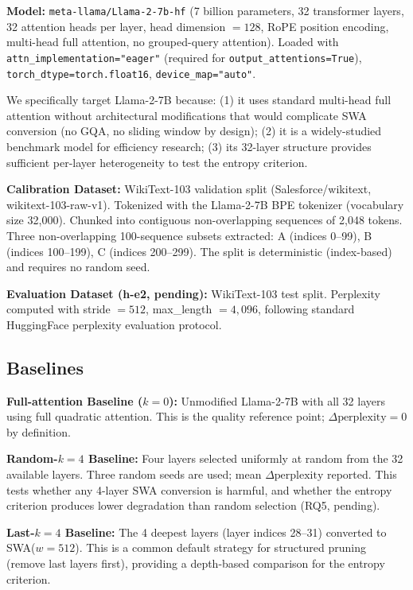 \textbf{Model:} \texttt{meta-llama/Llama-2-7b-hf} (7 billion parameters, 32 transformer layers, 32 attention heads per layer, head dimension $= 128$, RoPE position encoding, multi-head full attention, no grouped-query attention). Loaded with \texttt{attn\_implementation="eager"} (required for \texttt{output\_attentions=True}), \texttt{torch\_dtype=torch.float16}, \texttt{device\_map="auto"}.

We specifically target Llama-2-7B because: (1) it uses standard multi-head full attention without architectural modifications that would complicate SWA conversion (no GQA, no sliding window by design); (2) it is a widely-studied benchmark model for efficiency research; (3) its 32-layer structure provides sufficient per-layer heterogeneity to test the entropy criterion.

\textbf{Calibration Dataset:} WikiText-103 validation split (Salesforce/wikitext, wikitext-103-raw-v1). Tokenized with the Llama-2-7B BPE tokenizer (vocabulary size 32,000). Chunked into contiguous non-overlapping sequences of 2,048 tokens. Three non-overlapping 100-sequence subsets extracted: A (indices 0--99), B (indices 100--199), C (indices 200--299). The split is deterministic (index-based) and requires no random seed.

\textbf{Evaluation Dataset (h-e2, pending):} WikiText-103 test split. Perplexity computed with stride $= 512$, max\_length $= 4,096$, following standard HuggingFace perplexity evaluation protocol.

\subsection{Baselines}

\textbf{Full-attention Baseline ($k=0$):} Unmodified Llama-2-7B with all 32 layers using full quadratic attention. This is the quality reference point; $\Delta\text{perplexity} = 0$ by definition.

\textbf{Random-$k=4$ Baseline:} Four layers selected uniformly at random from the 32 available layers. Three random seeds are used; mean $\Delta\text{perplexity}$ reported. This tests whether any 4-layer SWA conversion is harmful, and whether the entropy criterion produces lower degradation than random selection (RQ5, pending).

\textbf{Last-$k=4$ Baseline:} The 4 deepest layers (layer indices 28--31) converted to SWA($w=512$). This is a common default strategy for structured pruning (remove last layers first), providing a depth-based comparison for the entropy criterion.

